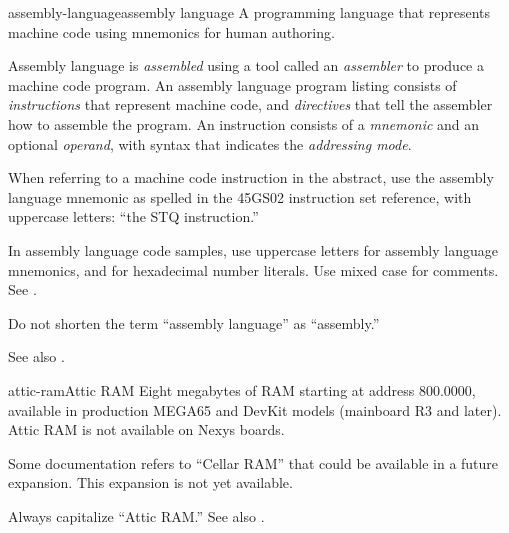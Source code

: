 \begin{sgentry}{assembly-language}{assembly language}
    A programming language that represents machine code using mnemonics for human authoring.

    Assembly language is \emph{assembled} using a tool called an \emph{assembler} to produce a machine code program. An assembly language program listing consists of \emph{instructions} that represent machine code, and \emph{directives} that tell the assembler how to assemble the program. An instruction consists of a \emph{mnemonic} and an optional \emph{operand}, with syntax that indicates the \emph{addressing mode}.

    When referring to a machine code instruction in the abstract, use the assembly language mnemonic as spelled in the 45GS02 instruction set reference, with uppercase letters: ``the STQ instruction.''

    In assembly language code samples, use uppercase letters for assembly language mnemonics, and for hexadecimal number literals. Use mixed case for comments. See .

    Do not shorten the term ``assembly language'' as ``assembly.''

    See also .
\end{sgentry}

\begin{sgentry}{attic-ram}{Attic RAM}
    Eight megabytes of RAM starting at address 800.0000, available in production MEGA65 and DevKit models (mainboard R3 and later). Attic RAM is not available on Nexys boards.

    Some documentation refers to ``Cellar RAM'' that could be available in a future expansion. This expansion is not yet available.

    Always capitalize ``Attic RAM.'' See also .
\end{sgentry}

